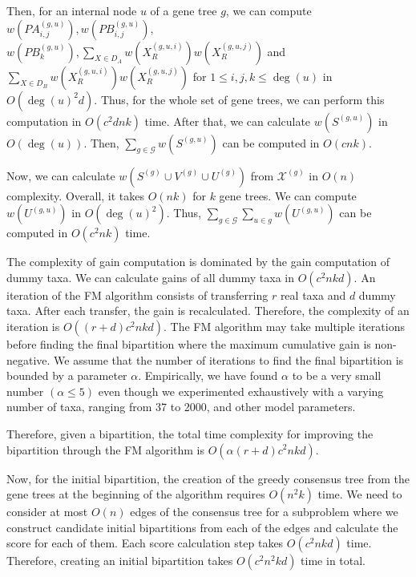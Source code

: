 \documentclass{article}
\begin{document}
Then, for an internal node $u$ of a gene tree $g$, we can compute $w\left(P A_{i, j}^{(g, u)}\right), w\left(P B_{i, j}^{(g, u)}\right)$, $w\left(P B_k^{(g, u)}\right), \sum_{X \in D_A} w\left(X_R^{(g, u, i)}\right) w\left(X_R^{(g, u, j)}\right)$ and $\sum_{X \in D_B} w\left(X_R^{(g, u, i)}\right) w\left(X_R^{(g, u, j)}\right)$ for $1 \leq i, j, k \leq \operatorname{deg}(u)$ in $O\left(\operatorname{deg}(u)^2 d\right)$. Thus, for the whole set of gene trees, we can perform this computation in $O\left(c^2 d n k\right)$ time. After that, we can calculate $w\left(S^{(g, u)}\right)$ in $O(\operatorname{deg}(u))$. Then, $\sum_{g \in \mathcal{G}} w\left(S^{(g, u)}\right)$ can be computed in $O(c n k)$.

Now, we can calculate $w\left(S^{(g)} \cup V^{(g)} \cup U^{(g)}\right)$ from $\mathcal{X}^{(g)}$ in $O(n)$ complexity. Overall, it takes $O(n k)$ for $k$ gene trees. We can compute $w\left(U^{(g, u)}\right)$ in $O\left(\operatorname{deg}(u)^2\right)$. Thus, $\sum_{g \in \mathcal{G}} \sum_{u \in g} w\left(U^{(g, u)}\right)$ can be computed in $O\left(c^2 n k\right)$ time.

The complexity of gain computation is dominated by the gain computation of dummy taxa. We can calculate gains of all dummy taxa in $O\left(c^2 n k d\right)$. An iteration of the FM algorithm consists of transferring $r$ real taxa and $d$ dummy taxa. After each transfer, the gain is recalculated. Therefore, the complexity of an iteration is $O\left((r + d) c^2 n k d\right)$. The FM algorithm may take multiple iterations before finding the final bipartition where the maximum cumulative gain is non-negative. We assume that the number of iterations to find the final bipartition is bounded by a parameter $\alpha$. Empirically, we have found $\alpha$ to be a very small number $(\alpha \leq 5)$ even though we experimented exhaustively with a varying number of taxa, ranging from 37 to 2000, and other model parameters.

Therefore, given a bipartition, the total time complexity for improving the bipartition through the FM algorithm is $O\left(\alpha (r + d) c^2 n k d\right)$.

Now, for the initial bipartition, the creation of the greedy consensus tree from the gene trees at the beginning of the algorithm requires $O\left(n^2 k\right)$ time. We need to consider at most $O(n)$ edges of the consensus tree for a subproblem where we construct candidate initial bipartitions from each of the edges and calculate the score for each of them. Each score calculation step takes $O\left(c^2 n k d\right)$ time. Therefore, creating an initial bipartition takes $O\left(c^2 n^2 k d\right)$ time in total.
\end{document}
